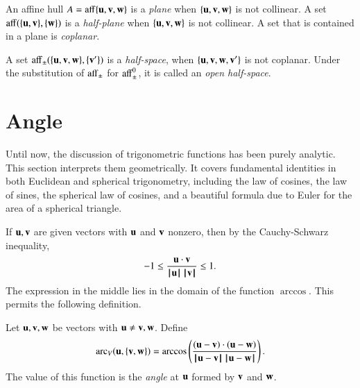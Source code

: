 \begin{definition}	
An affine hull $A=\op{aff}\{\u,\v,\w\}$ is a {\it plane} when $\{\u,\v,\w\}$ is not collinear.   A set $\op{aff}(\{\u,\v\},\{\w\})$
is a {\it half-plane} when $\{\u,\v,\w\}$ is not collinear. A set that is contained in a plane is  {\it coplanar}.
\end{definition}
%
%
%
%


\begin{definition} A set $\op{aff}_{\pm}(\{\u,\v,\w\},\{\v'\})$ is a {\it half-space},
when $\{\u,\v,\w,\v'\}$ is not coplanar.  Under the substitution of
$\op{aff}_{\pm}$ for $\op{aff}_{\pm}^0$, it is called an
{\it open half-space}.
\end{definition}
%
%

\section{Angle}\label{sec:angle}

Until now, the discussion of trigonometric functions has been purely analytic.  This section
interprets them geometrically.
It covers fundamental identities
in both Euclidean and spherical trigonometry, including the law
of cosines, the law of sines, the spherical law of cosines, 
and a beautiful formula due to Euler for
the area of a spherical triangle.

If $\u,\v$ are given vectors with $\u$ and $\v$ nonzero, then by the
Cauchy-Schwarz inequality,
    $$-1 \le \frac{\u\cdot \v}{\normo{\u}\,\normo{\v}} \le 1.$$
The expression in the middle lies in the domain of the function $\arccos$. This permits the following definition.
%
%
%

\begin{definition}\label{def:angle}
Let $\u,\v,\w$ be vectors with $\u\ne \v,\w$.
Define 
    $$
    \arc_V(\u,\{\v,\w\}) = \arccos\left(\frac{(\u-\v)\cdot (\u-\w)}{\norm{\u}{\v}\,\norm{\u}{\w}}\right).
    $$
The value of this function is the {\it angle} at $\u$ formed by $\v$ and $\w$.
%
%
%
%
%
\end{definition}

